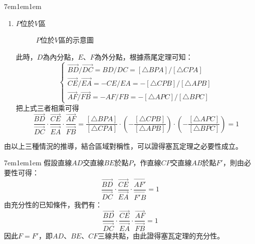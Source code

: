 \documentclass[12pt]{article}
\begin{document}
\begin{mybox}[必要性證明]{7em}{1em}{1em}
\begin{enumerate}[label=Case \arabic*：, itemsep=2em]
        \item $P$位於$V$區
        \begin{figure}[H]
            \centering 
            \caption{$P$位於$V$區的示意圖}
            \label{fig:concurrent_s2-4}
        \end{figure}
        此時，$D$為內分點，$E$、$F$為外分點，根據燕尾定理可知：
        $$
            \begin{cases}
                \overrightarrow{BD}/\overrightarrow{DC}=BD/DC=\left[\triangle{BPA}\right]/\left[\triangle{CPA}\right]\\
                \overrightarrow{CE}/\overrightarrow{EA}=-CE/EA=-\left[\triangle{CPB}\right]/\left[\triangle{APB}\right]\\
                \overrightarrow{AF}/\overrightarrow{FB}=-AF/FB=-\left[\triangle{APC}\right]/\left[\triangle{BPC}\right]
            \end{cases}
        $$
        把上式三者相乘可得
        $$
            \frac{\overrightarrow{BD}}{\overrightarrow{DC}}
            \cdot\frac{\overrightarrow{CE}}{\overrightarrow{EA}}
            \cdot\frac{\overrightarrow{AF}}{\overrightarrow{FB}}
            =\frac{\left[\triangle{BPA}\right]}{\left[\triangle{CPA}\right]}
            \cdot\left(-\frac{\left[\triangle{CPB}\right]}{\left[\triangle{APB}\right]}\right)
            \cdot\left(-\frac{\left[\triangle{APC}\right]}{\left[\triangle{BPC}\right]}\right)
            =1
        $$
    \end{enumerate}
    由以上三種情況的推導，結合區域對稱性，可以證得塞瓦定理之必要性成立。
\end{mybox}
\begin{mybox}[充分性證明]{7em}{1em}{1em}
    假設直線$AD$交直線$BE$於點$P$，作直線$CP$交直線$AB$於點$F'$，則由必要性可得：
    $$
        \frac{\overrightarrow{BD}}{\overrightarrow{DC}}
        \cdot\frac{\overrightarrow{CE}}{\overrightarrow{EA}}
        \cdot\frac{\overrightarrow{AF'}}{\overrightarrow{F'B}} = 1
    $$
    由充分性的已知條件，我們有：
    $$
        \frac{\overrightarrow{BD}}{\overrightarrow{DC}}
        \cdot\frac{\overrightarrow{CE}}{\overrightarrow{EA}}
        \cdot\frac{\overrightarrow{AF}}{\overrightarrow{FB}} = 1
    $$
    因此$F=F'$，即$AD$、$BE$、$CF$三線共點，由此證得塞瓦定理的充分性。
\end{mybox}
\end{document}
